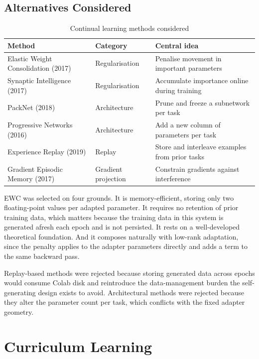 \documentclass[12pt,a4paper]{report}
\begin{document}
\subsection{Alternatives Considered}

\begin{table}[htbp]
\centering
\caption{Continual learning methods considered}
\begin{tabular}{>{\raggedright\arraybackslash}p{3.5cm} p{2.5cm} p{5.5cm}}
\toprule
\textbf{Method} & \textbf{Category} & \textbf{Central idea} \\
\midrule
Elastic Weight Consolidation (2017) & Regularisation & Penalise movement in important parameters \\
Synaptic Intelligence (2017) & Regularisation & Accumulate importance online during training \\
PackNet (2018) & Architecture & Prune and freeze a subnetwork per task \\
Progressive Networks (2016) & Architecture & Add a new column of parameters per task \\
Experience Replay (2019) & Replay & Store and interleave examples from prior tasks \\
Gradient Episodic Memory (2017) & Gradient projection & Constrain gradients against interference \\
\bottomrule
\end{tabular}
\end{table}

EWC was selected on four grounds. It is memory-efficient, storing only two floating-point values per adapted parameter. It requires no retention of prior training data, which matters because the training data in this system is generated afresh each epoch and is not persisted. It rests on a well-developed theoretical foundation. And it composes naturally with low-rank adaptation, since the penalty applies to the adapter parameters directly and adds a term to the same backward pass.

Replay-based methods were rejected because storing generated data across epochs would consume Colab disk and reintroduce the data-management burden the self-generating design exists to avoid. Architectural methods were rejected because they alter the parameter count per task, which conflicts with the fixed adapter geometry.

\section{Curriculum Learning}
\end{document}
